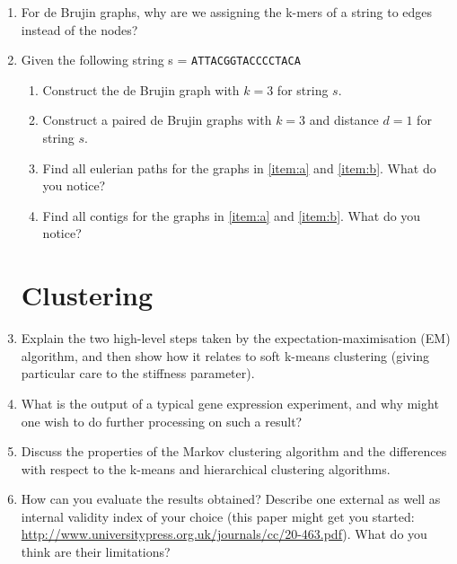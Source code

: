 \documentclass[11pt,runningheads,a4paper]{article}
\newcommand{\DNA}[1]{\texttt{\uppercase{#1}}}
\begin{document}
\begin{enumerate}
  \item For de Brujin graphs, why are we assigning the k-mers of a string to edges instead of the nodes?
  \item Given the following string s = \DNA{ATTACGGTACCCCTACA}
    \begin{enumerate}
      \item \label{item:a} Construct the de Brujin graph with $k=3$ for string $s$.
      \item \label{item:b} Construct a paired de Brujin graphs with $k=3$ and distance $d=1$ for string $s$.
      \item Find all eulerian paths for the graphs in \ref{item:a} and \ref{item:b}\@. What do you notice?
      \item Find all contigs for the graphs in \ref{item:a} and \ref{item:b}\@. What do you notice?
    \end{enumerate}

\section*{Clustering}
\label{sec:clustering}

\item  Explain the two high-level steps taken by the expectation-maximisation (EM) algorithm, and then show how it relates to soft k-means clustering (giving particular care to the stiffness parameter).
  \item  What is the output of a typical gene expression experiment, and why might one wish to do further processing on such a result?
  \item Discuss the properties of the Markov clustering algorithm and the differences with respect to the k-means and hierarchical clustering algorithms.
  \item How can you evaluate the results obtained? 
Describe one external as well as internal validity index of your choice (this paper might get you started: \url{http://www.universitypress.org.uk/journals/cc/20-463.pdf}). 
What do you think are their limitations?


\end{enumerate}
\end{document}
